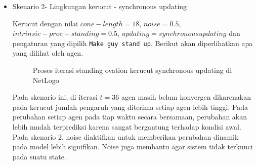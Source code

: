 \begin{itemize}
	\item Skenario 2- Lingkungan kerucut - synchronous updating

	Kerucut dengan nilai $cone-length=18$, $noise=0.5$, $intrinsic-proc-standing=0.5$, $updating= synchronous updating$ dan pengaturan yang dipilih \texttt{Make guy stand up}. Berikut akan diperlihatkan apa yang dilihat oleh agen.

	\begin{figure}[H]
		\centering
		\hfill
		\hfill
		\hfill
		\caption{Proses iterasi standing ovation kerucut synchronous updating di NetLogo}
		\label{fig:proses_sop_kerucut_sync}
	\end{figure}

	Pada skenario ini, di iterasi $t=36$ agen masih belum konvergen dikarenakan pada kerucut jumlah pengaruh yang diterima setiap agen lebih tinggi. Pada perubahan setiap agen pada tiap waktu secara bersamaan, perubahan akan lebih mudah terprediksi karena sangat bergantung terhadap kondisi awal. Pada skenario 2, noise diaktifkan untuk memberikan perubahan dinamik pada model lebih signifikan. Noise juga membantu agar sistem tidak terkunci pada suatu state.


\end{itemize}
